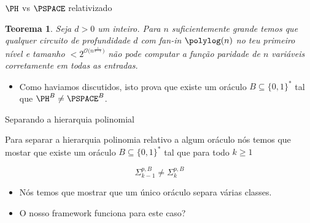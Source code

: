 \documentclass[landscape, 9pt]{beamer}
\newtheorem{teo}{Teorema}
\newcommand{\binalph}{\{0, 1\}}
\begin{document}
\begin{frame} {$\PH$ vs $\PSPACE$ relativizado}

\begin{teo}

Seja $d > 0$ um inteiro. Para $n$ suficientemente grande temos que qualquer circuito de profundidade $d$ com fan-in $\polylog(n)$ no teu primeiro nível e tamanho $< 2^{\mathcal{O}\big(n^{\frac{1}{d - 1}}\big)}$ não pode computar a função paridade de $n$ variáveis corretamente em todas as entradas. 

\end{teo}

\begin{itemize}

	\item Como haviamos discutidos, isto prova que existe um oráculo $B \subseteq \binalph^{*}$ tal que $\PH^{B} \neq \PSPACE^{B}$.

\end{itemize}

\end{frame}


\begin{frame} {Separando a hierarquia polinomial}

Para separar a hierarquia polinomia relativo a algum oráculo nós temos que mostar que existe um oráculo $B \subseteq \binalph^{*}$ tal que para todo $k \geq 1$

\begin{equation*}
	\Sigma_{k - 1}^{p, B} \neq \Sigma_{k}^{p, B}
\end{equation*}

\begin{itemize}

	\item Nós temos que mostrar que um único oráculo separa várias classes.
	
	\item O nosso framework funciona para este caso?

\end{itemize}

\end{frame}

\end{document}
